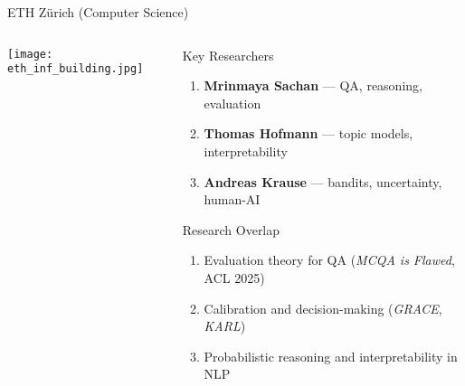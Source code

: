 \documentclass[compress]{beamer}
\begin{document}
\begin{frame}{ETH Zürich (Computer Science)}
\begin{columns}
  \begin{column}{0.45\textwidth}
    \texttt{[image: eth\_inf\_building.jpg]} %
  \end{column}
  \begin{column}{0.5\textwidth}
    \begin{block}{Key Researchers}
      \begin{enumerate}
        \item \textbf{Mrinmaya Sachan} — QA, reasoning, evaluation  
        \item \textbf{Thomas Hofmann} — topic models, interpretability  
        \item \textbf{Andreas Krause} — bandits, uncertainty, human-AI
      \end{enumerate}
    \end{block}

    \begin{block}{Research Overlap}
      \begin{enumerate}
        \item Evaluation theory for QA (\textit{MCQA is Flawed}, ACL 2025)
        \item Calibration and decision-making (\textit{GRACE}, \textit{KARL})
        \item Probabilistic reasoning and interpretability in NLP
      \end{enumerate}
    \end{block}
  \end{column}
\end{columns}
\end{frame}
\end{document}
